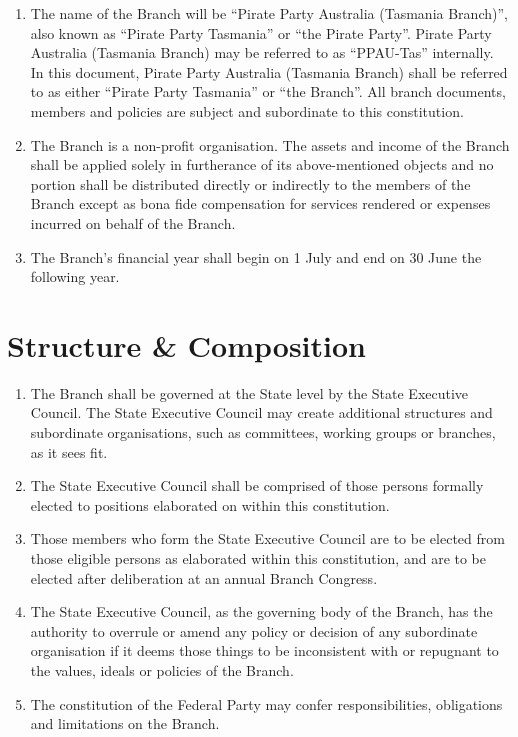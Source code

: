 \documentclass[a4paper,titlepage,8.5pt]{article}
\newcommand{\branch}{Tasmania}
\newcommand{\abbreviation}{Tas}
\newcommand{\stateorterritory}{State}
\begin{document}
\begin{enumerate}
\item The name of the Branch will be ``Pirate Party Australia ({\branch} Branch)'', also known as ``Pirate Party {\branch}'' or ``the Pirate Party''. Pirate Party Australia ({\branch} Branch) may be referred to as ``PPAU-{\abbreviation}'' internally. In this document, Pirate Party Australia ({\branch} Branch) shall be referred to as either ``Pirate Party {\branch}'' or ``the Branch''. All branch documents, members and policies are subject and subordinate to this constitution.
\item The Branch is a non-profit organisation. The assets and income of the Branch shall be applied solely in furtherance of its above-mentioned objects and no portion shall be distributed directly or indirectly to the members of the Branch except as bona fide compensation for services rendered or expenses incurred on behalf of the Branch.
\item The Branch's financial year shall begin on 1 July and end on 30 June the following year.
\end{enumerate}

\section{Structure \& Composition}

\begin{enumerate}
\item The Branch shall be governed at the {\stateorterritory} level by the {\stateorterritory} Executive Council. The {\stateorterritory} Executive Council may create additional structures and subordinate organisations, such as committees, working groups or branches, as it sees fit.
\item The {\stateorterritory} Executive Council shall be comprised of those persons formally elected to positions elaborated on within this constitution.
\item Those members who form the {\stateorterritory} Executive Council are to be elected from those eligible persons as elaborated within this constitution, and are to be elected after deliberation at an annual Branch Congress.
\item The {\stateorterritory} Executive Council, as the governing body of the Branch, has the authority to overrule or amend any policy or decision of any subordinate organisation if it deems those things to be inconsistent with or repugnant to the values, ideals or policies of the Branch.
\item The constitution of the Federal Party may confer responsibilities, obligations and limitations on the Branch.
\end{enumerate}
\end{document}
